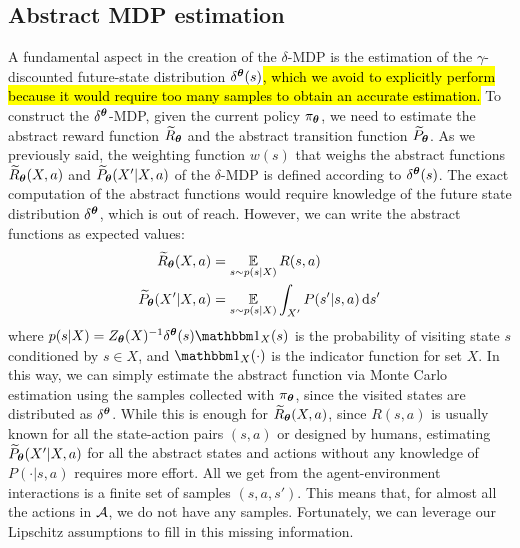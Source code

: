 \subsection{Abstract MDP estimation}\label{sec:mdpest}
A fundamental aspect in the creation of the $\delta$-\ac{MDP} is the estimation of the $\gamma$-discounted future-state distribution $\delta^{\boldsymbol{\theta}}(s)$\hl{, which we avoid to explicitly perform because it would require too many samples to obtain an accurate estimation.} 
To construct the $\delta^{\boldsymbol{\theta}}$-\ac{MDP}, given the current policy $\pi_{\boldsymbol{\theta}}$, we need to estimate the abstract reward function $\widetilde{R}_{\boldsymbol{\theta}}$ and the abstract transition function $\widetilde{P}_{\boldsymbol{\theta}}$. As we previously said, the weighting function $w(s)$ that weighs the abstract functions $\widetilde{R}_{\boldsymbol{\theta}}(X, a)$ and $\widetilde{P}_{\boldsymbol{\theta}}(X'|X, a)$ of the $\delta$-\ac{MDP} is defined according to $\delta^{\boldsymbol{\theta}}(s)$. The exact computation of the abstract functions would require knowledge of the future state distribution $\delta^{\boldsymbol{\theta}}$, which is out of reach. 
However, we can write the abstract functions as expected values:
\begin{align}
\widetilde{R}_{\boldsymbol{\theta}}(X, a) &= \operatorname*{\mathbb{E}}_{s \sim p(s | X)} R(s, a) \label{eq:mcr}\\
\widetilde{P}_{\boldsymbol{\theta}}(X' | X, a) &= \operatorname*{\mathbb{E}}_{s \sim p(s | X)} \int_{X'} P(s' | s, a) \,\mathrm{d} s'\label{eq:mcp}
\end{align}
where $p(s | X) = Z_{\vtheta}(X)^{-1}\delta^{\vtheta}(s)\Ind_X(s)$ is the probability of visiting state $s$ conditioned by $s\in X$, and $\Ind_X(\cdot)$ is the indicator function for set $X$.
In this way, we can simply estimate the abstract function via Monte Carlo estimation using the samples collected with $\pi_{\boldsymbol{\theta}}$, since the visited states are distributed as $\delta^{\boldsymbol{\theta}}$.
While this is enough for $\widetilde{R}_{\boldsymbol{\theta}}(X, a)$, since $R(s, a)$ is usually known for all the state-action pairs $(s,a)$ or designed by humans, estimating $\widetilde{P}_{\boldsymbol{\theta}}(X'|X, a)$ for all the abstract states and actions without any knowledge of $P(\cdot|s, a)$ requires more effort. All we get from the agent-environment interactions is a finite set of samples $(s,a,s')$. This means that, for almost all the actions in $\mathcal{A}$, we do not have any samples. Fortunately, we can leverage our Lipschitz assumptions to fill in this missing information.\\
